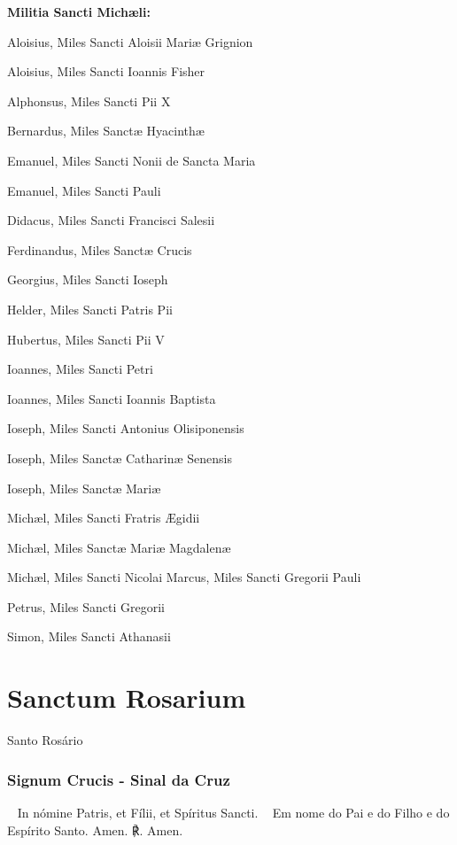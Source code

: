 \textbf{Militia Sancti Michæli:}
\begin{paracol}{2}
\small{
Aloisius, Miles Sancti Aloisii Mariæ Grignion

Aloisius, Miles Sancti Ioannis Fisher

Alphonsus, Miles Sancti Pii X

Bernardus, Miles Sanctæ Hyacinthæ

Emanuel, Miles Sancti Nonii de Sancta Maria

Emanuel, Miles Sancti Pauli

Didacus, Miles Sancti Francisci Salesii

Ferdinandus, Miles Sanctæ Crucis

Georgius, Miles Sancti Ioseph

Helder, Miles Sancti Patris Pii

Hubertus, Miles Sancti Pii V

Ioannes, Miles Sancti Petri

Ioannes, Miles Sancti Ioannis Baptista

Ioseph, Miles Sancti Antonius Olisiponensis

Ioseph, Miles Sanctæ Catharinæ Senensis

Ioseph, Miles Sanctæ Mariæ

Michæl, Miles Sancti Fratris Ægidii

Michæl, Miles Sanctæ Mariæ Magdalenæ

Michæl, Miles Sancti Nicolai
\switchcolumn
Marcus, Miles Sancti Gregorii Pauli

Petrus, Miles Sancti Gregorii

Simon, Miles Sancti Athanasii
}
\end{paracol}

\newpage

\section{Sanctum Rosarium}
\begin{nscenter}Santo Rosário\end{nscenter}

\emph{}

\subsubsection{Signum Crucis - Sinal da Cruz}
\begin{paracol}{2}
{\redx ~} In nómine Patris, et Fílii, et Spíritus Sancti.
\switchcolumn
{\redx ~} Em nome do Pai e do Filho e do Espírito Santo.
 Amen.
\switchcolumn
{\redx ℟.} Amen.
\end{paracol}

